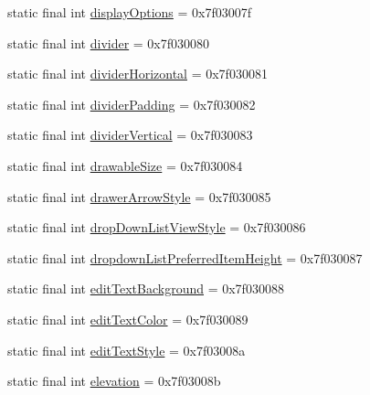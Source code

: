 \begin{DoxyCompactItemize}
\item 
static final int \mbox{\hyperlink{classcom_1_1google_1_1android_1_1gms_1_1R_1_1attr_ab11f4468eef7071ee088263d76283917}{display\+Options}} = 0x7f03007f
\item 
static final int \mbox{\hyperlink{classcom_1_1google_1_1android_1_1gms_1_1R_1_1attr_a16283b244cbf053554c240dc9aaf605b}{divider}} = 0x7f030080
\item 
static final int \mbox{\hyperlink{classcom_1_1google_1_1android_1_1gms_1_1R_1_1attr_ab0ec3218d7662d80a611f63bae98cfe0}{divider\+Horizontal}} = 0x7f030081
\item 
static final int \mbox{\hyperlink{classcom_1_1google_1_1android_1_1gms_1_1R_1_1attr_a3b07e92c9fcac8a21e002877f31c0067}{divider\+Padding}} = 0x7f030082
\item 
static final int \mbox{\hyperlink{classcom_1_1google_1_1android_1_1gms_1_1R_1_1attr_a70ecc484bef6bcbdfb682e289005765f}{divider\+Vertical}} = 0x7f030083
\item 
static final int \mbox{\hyperlink{classcom_1_1google_1_1android_1_1gms_1_1R_1_1attr_ad5a4acb0dd70fb6606e9869f3af8fd23}{drawable\+Size}} = 0x7f030084
\item 
static final int \mbox{\hyperlink{classcom_1_1google_1_1android_1_1gms_1_1R_1_1attr_a5b7c8def10206e7f59ea8be239fff098}{drawer\+Arrow\+Style}} = 0x7f030085
\item 
static final int \mbox{\hyperlink{classcom_1_1google_1_1android_1_1gms_1_1R_1_1attr_ac04ac9318dd7803b39b3927e68f64505}{drop\+Down\+List\+View\+Style}} = 0x7f030086
\item 
static final int \mbox{\hyperlink{classcom_1_1google_1_1android_1_1gms_1_1R_1_1attr_a0d18bbba1f0700bfb32cfb8609a1c3b0}{dropdown\+List\+Preferred\+Item\+Height}} = 0x7f030087
\item 
static final int \mbox{\hyperlink{classcom_1_1google_1_1android_1_1gms_1_1R_1_1attr_a406f2755dd6a60a29994d16922d2b3b1}{edit\+Text\+Background}} = 0x7f030088
\item 
static final int \mbox{\hyperlink{classcom_1_1google_1_1android_1_1gms_1_1R_1_1attr_a4332c6bebedf8210980ced1dfe7ded26}{edit\+Text\+Color}} = 0x7f030089
\item 
static final int \mbox{\hyperlink{classcom_1_1google_1_1android_1_1gms_1_1R_1_1attr_ab42a4a7bb038ddcc815ab85f8d0c1358}{edit\+Text\+Style}} = 0x7f03008a
\item 
static final int \mbox{\hyperlink{classcom_1_1google_1_1android_1_1gms_1_1R_1_1attr_af14e4faca1919d7d70e5d7dc3e63b799}{elevation}} = 0x7f03008b

\end{DoxyCompactItemize}
